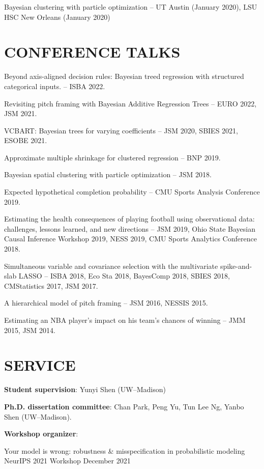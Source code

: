 \documentclass[margin]{res}
\begin{document}
\begin{resume}
Bayesian clustering with particle optimization -- UT Austin (January 2020), LSU HSC New Orleans (January 2020)

\section{CONFERENCE \hspace{0.1in} TALKS}

Beyond axis-aligned decision rules: Bayesian treed regression with structured categorical inputs. -- ISBA 2022.

Revisiting pitch framing with Bayesian Additive Regression Trees -- EURO 2022, JSM 2021.

VCBART: Bayesian trees for varying coefficients -- JSM 2020, SBIES 2021, ESOBE 2021.

Approximate multiple shrinkage for clustered regression -- BNP 2019.

Bayesian spatial clustering with particle optimization -- JSM 2018. 

Expected hypothetical completion probability -- CMU Sports Analysis Conference 2019.

Estimating the health consequences of playing football using observational data: challenges, lessons learned, and new directions -- JSM 2019, Ohio State Bayesian Causal Inference Workshop 2019, NESS 2019, CMU Sports Analytics Conference 2018.

Simultaneous variable and covariance selection with the multivariate spike-and-slab LASSO -- ISBA 2018, Eco Sta 2018, BayesComp 2018, SBIES 2018, CMStatistics 2017, JSM 2017.

A hierarchical model of pitch framing -- JSM 2016, NESSIS 2015.

Estimating an NBA player's impact on his team's chances of winning -- JMM 2015, JSM 2014.

\section{SERVICE}

\textbf{Student supervision}: Yunyi Shen (UW--Madison)

\textbf{Ph.D. dissertation committee}: Chan Park, Peng Yu, Tun Lee Ng, Yanbo Shen (UW--Madison).

\textbf{Workshop organizer}: 

Your model is wrong: robustness \& misspecification in probabilistic modeling \\
NeurIPS 2021 Workshop \hfill December 2021


\end{resume}
\end{document}
